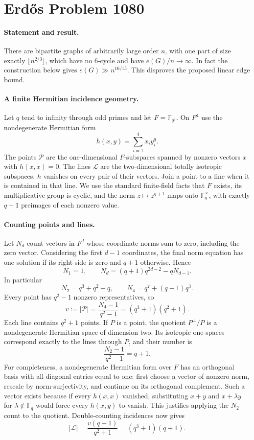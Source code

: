 \section*{Erd\H{o}s Problem 1080}

\paragraph{Statement and result.}
There are bipartite graphs of arbitrarily large order \(n\), with one part of size exactly \(\lfloor n^{2/3}\rfloor\), which have no \(6\)-cycle and have \(e(G)/n\to\infty\). In fact the construction below gives \(e(G)\gg n^{16/15}\). This disproves the proposed linear edge bound.

\paragraph{A finite Hermitian incidence geometry.}
Let \(q\) tend to infinity through odd primes and let \(F=\mathbb F_{q^2}\). On \(F^4\) use the nondegenerate Hermitian form
\[
 h(x,y)=\sum_{i=1}^4 x_i y_i^q.
\]
The points \(\mathcal P\) are the one-dimensional \(F\)-subspaces spanned by nonzero vectors \(x\) with \(h(x,x)=0\). The lines \(\mathcal L\) are the two-dimensional totally isotropic subspaces: \(h\) vanishes on every pair of their vectors. Join a point to a line when it is contained in that line.
We use the standard finite-field facts that \(F\) exists, its multiplicative group is cyclic, and the norm \(z\mapsto z^{q+1}\) maps onto \(\mathbb F_q^\times\), with exactly \(q+1\) preimages of each nonzero value.

\paragraph{Counting points and lines.}
Let \(N_d\) count vectors in \(F^d\) whose coordinate norms sum to zero, including the zero vector. Considering the first \(d-1\) coordinates, the final norm equation has one solution if its right side is zero and \(q+1\) otherwise. Hence
\[
 N_1=1,\qquad
 N_d=(q+1)q^{2d-2}-qN_{d-1}.
\]
In particular
\[
 N_2=q^3+q^2-q,\qquad
 N_4=q^7+(q-1)q^3.
\]
Every point has \(q^2-1\) nonzero representatives, so
\[
 v:=|\mathcal P|=\frac{N_4-1}{q^2-1}
 =(q^3+1)(q^2+1).
 \tag{1}
\]
Each line contains \(q^2+1\) points. If \(P\) is a point, the quotient \(P^\perp/P\) is a nondegenerate Hermitian space of dimension two. Its isotropic one-spaces correspond exactly to the lines through \(P\), and their number is
\[
 \frac{N_2-1}{q^2-1}=q+1.
 \tag{2}
\]
For completeness, a nondegenerate Hermitian form over \(F\) has an orthogonal basis with all diagonal entries equal to one: first choose a vector of nonzero norm, rescale by norm-surjectivity, and continue on its orthogonal complement. Such a vector exists because if every \(h(x,x)\) vanished, substituting \(x+y\) and \(x+\lambda y\) for \(\lambda\notin\mathbb F_q\) would force every \(h(x,y)\) to vanish. This justifies applying the \(N_2\) count to the quotient. Double-counting incidences now gives
\[
 |\mathcal L|=\frac{v(q+1)}{q^2+1}
 =(q^3+1)(q+1).
 \tag{3}
\]

